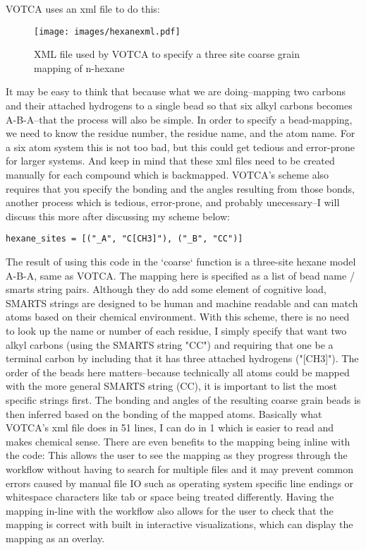 VOTCA uses an xml file to do this:


\begin{wrapfigure}{L}{0.5\linewidth}
    \centering
    \texttt{[image: images/hexanexml.pdf]}
    \caption{XML file used by VOTCA to specify a three site coarse grain mapping of n-hexane}
    \label{fig:hexanexml}
\end{wrapfigure}

It may be easy to think that because what we are doing--mapping two carbons and their attached hydrogens to a single bead so that six alkyl carbons becomes A-B-A--that the process will also be simple.
In order to specify a bead-mapping, we need to know the residue number, the residue name, and the atom name.
For a six atom system this is not too bad, but this could get tedious and error-prone for larger systems.
And keep in mind that these xml files need to be created manually for each compound which is backmapped.
VOTCA's scheme also requires that you specify the bonding and the angles resulting from those bonds, another process which is tedious, error-prone, and probably unecessary--I will discuss this more after discussing my scheme below:
\begin{lstlisting}
hexane_sites = [("_A", "C[CH3]"), ("_B", "CC")]
\end{lstlisting}
The result of using this code in the `coarse` function is a three-site hexane model A-B-A, same as VOTCA.%
The mapping here is specified as a list of bead name / smarts string pairs.
Although they do add some element of cognitive load, SMARTS strings are designed to be human and machine readable and can match atoms based on their chemical environment.
With this scheme, there is no need to look up the name or number of each residue, I simply specify that want two alkyl carbons (using the SMARTS string "CC") and requiring that one be a terminal carbon by including that it has three attached hydrogens ("[CH3]").
The order of the beads here matters--because technically all atoms could be mapped with the more general SMARTS string (CC), it is important to list the most specific strings first.
The bonding and angles of the resulting coarse grain beads is then inferred based on the bonding of the mapped atoms.
Basically what VOTCA's xml file does in 51 lines, I can do in 1 which is easier to read and makes chemical sense. 
There are even benefits to the mapping being inline with the code:
This allows the user to see the mapping as they progress through the workflow without having to search for multiple files and it may prevent common errors caused by manual file IO such as operating system specific line endings or whitespace characters like tab or space being treated differently.
Having the mapping in-line with the workflow also allows for the user to check that the mapping is correct with built in interactive visualizations, which can display the mapping as an overlay. %

